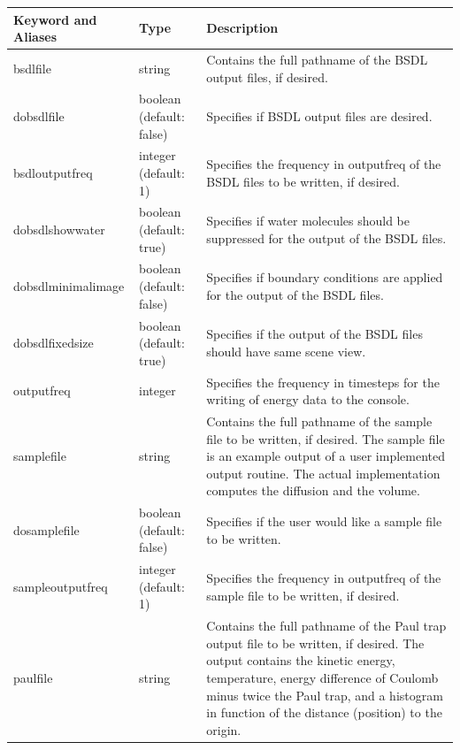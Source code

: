 \documentclass[11pt]{report}
\begin{document}
  \begin{tabular}{|p{5.5cm}|p{4cm}|p{6cm}|}\hline
    Keyword and Aliases & Type & Description   \\\hline\hline

    bsdlfile &
    string &
    Contains the full pathname of the BSDL output files, if desired. \\\hline

    dobsdlfile &
    boolean (default: false) &
    Specifies if BSDL output files are desired. \\\hline

    bsdloutputfreq &
    integer (default: 1) &
    Specifies the frequency in outputfreq of the BSDL files to be written, if desired.\\\hline

    dobsdlshowwater &
    boolean (default: true) &
    Specifies if water molecules should be suppressed for the output of
    the BSDL files. \\\hline

    dobsdlminimalimage &
    boolean (default: false) &
    Specifies if boundary conditions are applied for the output of
    the BSDL files. \\\hline

    dobsdlfixedsize &
    boolean (default: true) &
    Specifies if the output of
    the BSDL files should have same scene view. \\\hline


    outputfreq &
    integer &
    Specifies the frequency in timesteps for the writing of energy data to the console. \\\hline

    samplefile &
    string &
    Contains the full pathname of the sample file to be written, if
    desired.  The sample file is an example output of a user implemented
    output routine. The actual implementation computes the diffusion
    and the volume.\\\hline

    dosamplefile &
    boolean (default: false) &
    Specifies if the user would like a sample file to be written. \\\hline


    sampleoutputfreq &
    integer (default: 1) &
    Specifies the frequency in outputfreq of the sample file to be written, if desired.\\\hline


    paulfile &
    string &
    Contains the full pathname of the Paul trap output file to be written, if
    desired.  The output contains the kinetic energy, temperature,
    energy difference of Coulomb minus twice the Paul trap, and 
    a histogram in function of the distance (position) to the origin.\\\hline


\end{tabular}
\end{document}
